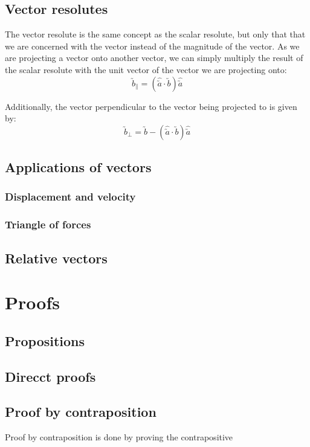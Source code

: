 \documentclass[a4paper,10pt]{report}
\begin{document}
\subsection{Vector resolutes}
The vector resolute is the same concept as the scalar resolute, but only that that we are concerned with the vector instead of the magnitude of the vector.  As we are projecting a vector onto another vector, we can simply multiply the result of the scalar resolute with the unit vector of the vector we are projecting onto:
$$
	\utilde{b}_{\parallel} = (\hat{\utilde{a}} \cdot \utilde{b}) \hat{\utilde{a}}
$$

Additionally, the vector perpendicular to the vector being projected to is given by:
$$
	\utilde{b}_{\perp} = \utilde{b} - (\hat{\utilde{a}} \cdot \utilde{b}) \hat{\utilde{a}}
$$

\subsection{Applications of vectors}
\subsubsection{Displacement and velocity}

\subsubsection{Triangle of forces}

\subsection{Relative vectors}


\section{Proofs}
\subsection{Propositions}

\subsection{Direcct proofs}

\subsection{Proof by contraposition}
Proof by contraposition is done by proving the contrapositive
\end{document}
